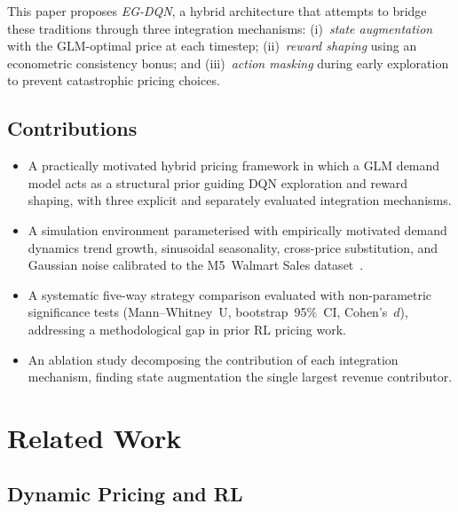 \documentclass[journal, 10pt, twoside]{IEEEtran}
\begin{document}
This paper proposes \textit{EG-DQN}, a hybrid architecture that attempts to bridge these traditions through three integration
mechanisms: (i)~\textit{state augmentation} with the GLM-optimal price
at each timestep; (ii)~\textit{reward shaping} using an econometric
consistency bonus; and (iii)~\textit{action masking} during early
exploration to prevent catastrophic pricing choices.

\subsection*{Contributions}

\begin{itemize}
  \item A practically motivated hybrid pricing framework in which a GLM demand model acts as
    a structural prior guiding DQN exploration and reward shaping, with
    three explicit and separately evaluated integration mechanisms.
  \item A simulation environment parameterised with empirically motivated
    demand dynamics trend growth, sinusoidal seasonality, cross-price
    substitution, and Gaussian noise calibrated to the M5~Walmart
    Sales dataset~\cite{xia2023}.
  \item A systematic five-way strategy comparison evaluated with
    non-parametric significance tests (Mann--Whitney~U, bootstrap~95\%~CI,
    Cohen's~$d$), addressing a methodological gap in prior RL pricing work.
  \item An ablation study decomposing the contribution of each integration
    mechanism, finding state augmentation the single largest revenue
    contributor.
\end{itemize}

\section{Related Work}
\label{sec:related}

\subsection{Dynamic Pricing and RL}
\end{document}

